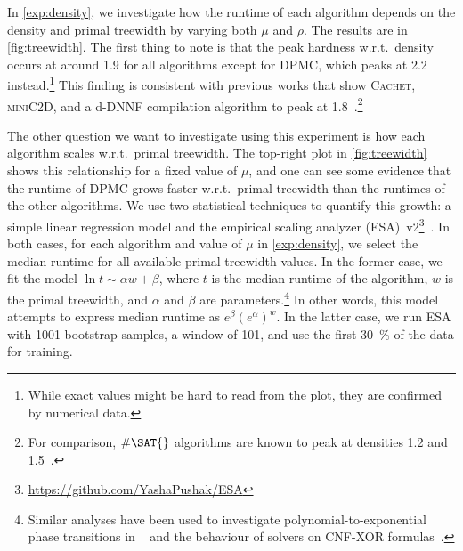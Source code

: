 \documentclass[runningheads]{llncs}
\begin{document}
In \cref{exp:density}, we investigate how the runtime of each algorithm depends
on the density and primal treewidth by varying both $\mu$ and $\rho$. The
results are in \cref{fig:treewidth}. The first thing to note is that the peak
hardness w.r.t.\ density occurs at around 1.9 for all algorithms except for
\textsc{DPMC}, which peaks at 2.2 instead.\footnote{While exact values might be
  hard to read from the plot, they are confirmed by numerical data.} This
finding is consistent with previous works that show \textsc{Cachet},
\textsc{miniC2D}, and a d-DNNF compilation algorithm to peak at
1.8~\cite{DBLP:conf/aaai/Darwiche02,DBLP:conf/cp/GuptaRM20,DBLP:conf/sat/SangBBKP04}.\footnote{For
  comparison, $\#\SAT{}$ algorithms are known to peak at densities 1.2 and
  1.5~\cite{DBLP:conf/aaai/Pehoushek00,DBLP:journals/jair/BirnbaumL99}.}

The other question we want to investigate using this experiment is how each
algorithm scales w.r.t.\ primal treewidth. The top-right plot in
\cref{fig:treewidth} shows this relationship for a fixed value of $\mu$, and one
can see some evidence that the runtime of \textsc{DPMC} grows faster w.r.t.\
primal treewidth than the runtimes of the other algorithms. We use two
statistical techniques to quantify this growth: a simple linear regression model
and the empirical scaling analyzer
(ESA)~v2\footnote{\url{https://github.com/YashaPushak/ESA}}~\cite{DBLP:conf/gecco/PushakH20}.
In both cases, for each algorithm and value of $\mu$ in \cref{exp:density}, we
select the median runtime for all available primal treewidth values. In the
former case, we fit the model $\ln t \sim \alpha w + \beta$, where $t$ is the
median runtime of the algorithm, $w$ is the primal treewidth, and $\alpha$ and
$\beta$ are parameters.\footnote{Similar analyses have been used to investigate
  polynomial-to-exponential phase transitions in
  \SAT{}~\cite{DBLP:journals/constraints/CoarfaDASV03} and the behaviour of
  \SAT{} solvers on CNF-XOR formulas~\cite{DBLP:conf/ijcai/DudekMV17}.} In other
words, this model attempts to express median runtime as $e^\beta{(e^\alpha)}^w$.
In the latter case, we run ESA with 1001 bootstrap samples, a window of 101, and
use the first \SI{30}{\percent} of the data for training.
\end{document}
